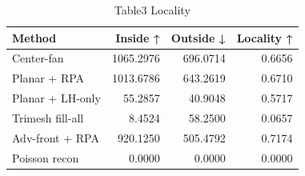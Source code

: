 \begin{table}
\caption{Table3 Locality}
\label{tab:table3_locality}
\begin{tabular}{lrrr}
\toprule
Method & Inside ↑ & Outside ↓ & Locality ↑ \\
\midrule
Center-fan & 1065.2976 & 696.0714 & 0.6656 \\
Planar + RPA & 1013.6786 & 643.2619 & 0.6710 \\
Planar + LH-only & 55.2857 & 40.9048 & 0.5717 \\
Trimesh fill-all & 8.4524 & 58.2500 & 0.0657 \\
Adv-front + RPA & 920.1250 & 505.4792 & 0.7174 \\
Poisson recon & 0.0000 & 0.0000 & 0.0000 \\
\bottomrule
\end{tabular}
\end{table}

